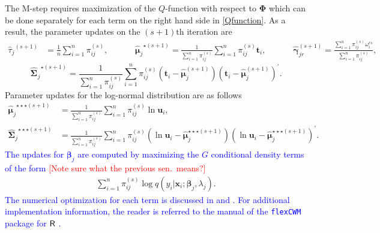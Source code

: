 \documentclass[11pt,letterpaper]{article}
\numberwithin{equation}{section}
\numberwithin{equation}{section}
\numberwithin{equation}{section}
\begin{document}
The M-step requires maximization of the $Q$-function with respect to $\bm \Phi$ which can be done separately for each term on the right hand side in \eqref{Qfunction}. %
As a result, the parameter updates on the $(s+1)$th iteration are
\begin{align*}
{\hat{\tau}_j}^{(s+1)}&=\frac{1}{n} \sum_{i=1}^n \pi_{ij}^{(s)}, && && {\hat{\bm{\mu}}_j}^{\star (s+1)}=\frac{1}{\sum_{i=1}^n \pi_{ij}^{(s)}} \sum_{i=1}^n \pi_{ij}^{(s)}\bm t_i, &&  && {\hat{\bm \gamma}^{(s+1)}_{jr}} =\frac{\sum_{i=1}^n \pi_{ij}^{(s)} \omega^{rs}_i} {\sum_{i=1}^n \pi_{ij}^{(s)}},
\end{align*}
$$
 {\widehat{\bm \Sigma^{}}_j}^{\star(s+1)}=\frac{1}{\sum_{i=1}^n \pi_{ij}^{(s)}} \sum_{i=1}^n \pi_{ij}^{(s)}(\bm t_i-\hat{\bm \mu}^{(s+1)}_j) (\bm t_i-\hat{\bm \mu}^{(s+1)}_j)^{'}.
$$
Parameter updates for the log-normal distribution are as follows
\begin{equation*}\begin{split}
{\hat{\bm \mu}_j}^{\star\star\star (s+1)}&=\frac{1}{\sum_{i=1}^n \pi_{ij}^{(s)}} \sum_{i=1}^n \pi_{ij}^{(s)}\ln \bm u_i,\\
{\widehat{\bm \Sigma}_j}^{\star\star\star(s+1)}&=\frac{1}{\sum_{i=1}^n \pi_{ij}^{(s)}} \sum_{i=1}^n \pi_{ij}^{(s)}(\ln \bm u_i-\hat{\bm \mu}^{\star\star\star(s+1)}_j) (\ln \bm u_i-\hat{\bm \mu}^{\star\star\star(s+1)}_j)^{'}. 
\end{split}\end{equation*}
\textcolor{blue} {The updates for $\bm{\beta}_j$ are computed by maximizing the $G$ conditional density terms of the form  } \textcolor{red}{[Note sure what the previous sen.\ means?]}
\begin{align}
\sum_{i=1}^{n}\pi^{(s)}_{ij} \log{q}(y_i|\bm x_i;\bm \beta_j,\lambda_j).
\label{eq30}
\end{align}
\textcolor{blue}{The numerical optimization for each term is discussed in \cite{Wedel+DeSabro:1995} and \cite{Wedel:2002}.
For additional implementation information, the reader is referred to the manual of the {\tt flexCWM} package \citep{Ingrassia+Punzo+Vittadini+Minotti:2015} for ${\sf R}$ \citep{R18}.
}

\end{document}
